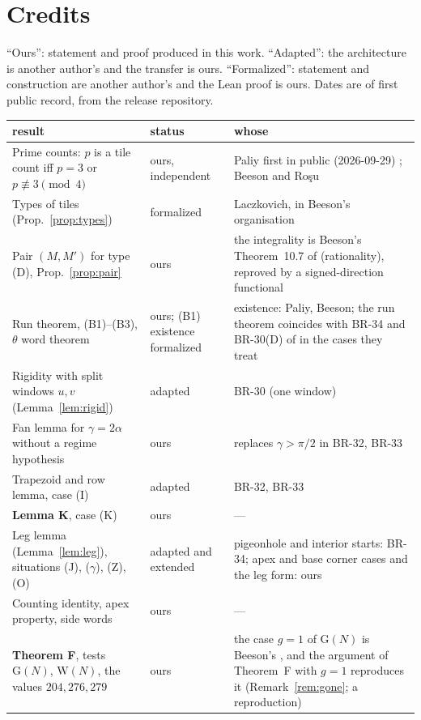 \documentclass[11pt,reqno]{amsart}
\theoremstyle{plain}
\theoremstyle{definition}
\begin{document}
\section{Credits}\label{sec:credits}
``Ours'': statement and proof produced in this work. ``Adapted'': the architecture is another author's and the transfer is ours. ``Formalized'': statement and construction are another author's and the Lean proof is ours. Dates are of first public record, from the release repository.
\begin{center}
\small
\begin{tabular}{@{}p{5.1cm}p{1.7cm}p{6.2cm}@{}}
\hline
result & status & whose\\
\hline
Prime counts: $p$ is a tile count iff $p=3$ or $p\not\equiv3\pmod4$ & ours, independent & Paliy first in public (2026-09-29) \cite{PaliyPrime}; Beeson and Ro\c{s}u \cite{BeesonRosu}\\
Types of tiles (Prop.~\ref{prop:types}) & formalized & Laczkovich, in Beeson's organisation\\
Pair $(M,M')$ for type (D), Prop.~\ref{prop:pair} & ours & the integrality is Beeson's Theorem~10.7 of \cite{BeesonIso} (rationality), reproved by a signed-direction functional\\
Run theorem, (B1)--(B3), $\theta$ word theorem & ours; (B1) existence formalized & existence: Paliy, Beeson; the run theorem coincides with BR-34 and BR-30(D) of \cite{BeesonRosu} in the cases they treat\\
Rigidity with split windows $u,v$ (Lemma~\ref{lem:rigid}) & adapted & BR-30 (one window)\\
Fan lemma for $\gamma=2\alpha$ without a regime hypothesis & ours & replaces $\gamma>\pi/2$ in BR-32, BR-33\\
Trapezoid and row lemma, case (I) & adapted & BR-32, BR-33\\
\textbf{Lemma K}, case (K) & ours & ---\\
Leg lemma (Lemma~\ref{lem:leg}), situations (J), ($\gamma$), (Z), (O) & adapted and extended & pigeonhole and interior starts: BR-34; apex and base corner cases and the leg form: ours\\
Counting identity, apex property, side words & ours & ---\\
\textbf{Theorem F}, tests $\mathrm G(N)$, $\mathrm W(N)$, the values $204,276,279$ & ours & the case $g=1$ of $\mathrm G(N)$ is Beeson's \cite{BeesonIso}, and the argument of Theorem~F with $g=1$ reproduces it (Remark~\ref{rem:gone}; a reproduction)\\

\end{tabular}
\end{center}
\end{document}
